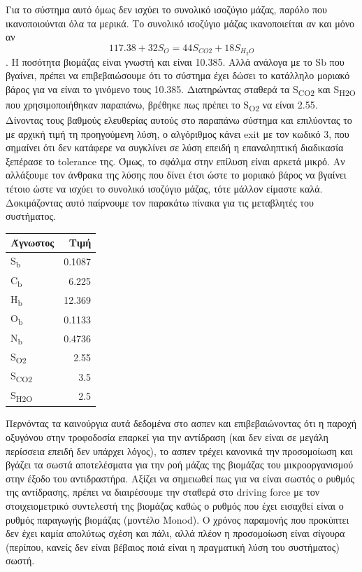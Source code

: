 \documentclass[11pt]{article}
\begin{document}
Για το σύστημα αυτό όμως δεν ισχύει το συνολικό ισοζύγιο μάζας, παρόλο που ικανοποιούνται όλα τα μερικά. Το συνολικό ισοζύγιο μάζας ικανοποιείται αν και μόνο αν \[ 117.38 + 32S_O = 44S_{CO2} + 18S_{H_2O} \]. Η ποσότητα βιομάζας είναι γνωστή και είναι 10.385. Αλλά ανάλογα με το Sb που βγαίνει, πρέπει να επιβεβαιώσουμε ότι το σύστημα έχει δώσει το κατάλληλο μοριακό βάρος για να είναι το γινόμενο τους 10.385. Διατηρώντας σταθερά τα S\textsubscript{CO}\textsubscript{2} και S\textsubscript{H2O} που χρησιμοποιήθηκαν παραπάνω, βρέθηκε πως πρέπει το S\textsubscript{O2} να είναι 2.55. Δίνοντας τους βαθμούς ελευθερίας αυτούς στο παραπάνω σύστημα και επιλύοντας το με αρχική τιμή τη προηγούμενη λύση, ο αλγόριθμος κάνει exit με τον κωδικό 3, που σημαίνει ότι δεν κατάφερε να συγκλίνει σε λύση επειδή η επαναληπτική διαδικασία ξεπέρασε το tolerance της. Όμως, το σφάλμα στην επίλυση είναι αρκετά μικρό. Αν αλλάξουμε τον άνθρακα της λύσης που δίνει έτσι ώστε το μοριακό βάρος να βγαίνει τέτοιο ώστε να ισχύει το συνολικό ισοζύγιο μάζας, τότε μάλλον είμαστε καλά. Δοκιμάζοντας αυτό παίρνουμε τον παρακάτω πίνακα για τις μεταβλητές του συστήματος.
\begin{center}
\begin{tabular}{lr}
Άγνωστος & Τιμή\\
\hline
S\textsubscript{b} & 0.1087\\
C\textsubscript{b} & 6.225\\
H\textsubscript{b} & 12.369\\
O\textsubscript{b} & 0.1133\\
N\textsubscript{b} & 0.4736\\
S\textsubscript{O2} & 2.55\\
S\textsubscript{CO2} & 3.5\\
S\textsubscript{H2O} & 2.5\\
\end{tabular}
\end{center}

Περνόντας τα καινούργια αυτά δεδομένα στο ασπεν και επιβεβαιώνοντας ότι η παροχή οξυγόνου στην τροφοδοσία επαρκεί για την αντίδραση (και δεν είναι σε μεγάλη περίσσεια επειδή δεν υπάρχει λόγος), το ασπεν τρέχει κανονικά την προσομοίωση και βγάζει τα σωστά αποτελέσματα για την ροή μάζας της βιομάζας του μικροοργανισμού στην έξοδο του αντιδραστήρα. Αξίζει να σημειωθεί πως για να είναι σωστός ο ρυθμός της αντίδρασης, πρέπει να διαιρέσουμε την σταθερά στο driving force με τον στοιχειομετρικό συντελεστή της βιομάζας καθώς ο ρυθμός που έχει εισαχθεί είναι ο ρυθμός παραγωγής βιομάζας (μοντέλο Monod). Ο χρόνος παραμονής που προκύπτει δεν έχει καμία απολύτως σχέση και πάλι, αλλά πλέον η προσομοίωση είναι σίγουρα (περίπου, κανείς δεν είναι βέβαιος ποιά είναι η πραγματική λύση του συστήματος) σωστή. 
\end{document}
